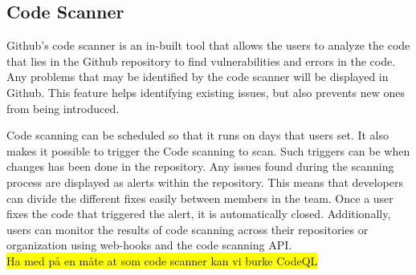 \subsection{Code Scanner}
Github's code scanner is an in-built tool that allows the users to analyze the code that lies in the Github repository to find vulnerabilities and errors in the code. Any problems that may be identified by the code scanner will be displayed in Github. This feature helps identifying existing issues, but also prevents new ones from being introduced. 

Code scanning can be scheduled so that it runs on days that users set. It also makes it possible to trigger the Code scanning to scan. Such triggers can be when changes has been done in the repository. 
 Any issues found during the scanning process are displayed as alerts within the repository. This means that developers can divide the different fixes easily between members in the team.  Once a user fixes the code that triggered the alert, it is automatically closed. Additionally, users can monitor the results of code scanning across their repositories or organization using web-hooks and the code scanning API. 
\cite{GithubCodeScanning}
\\
\colorbox{yellow}{Ha med på en måte at som code scanner kan vi burke CodeQL}


